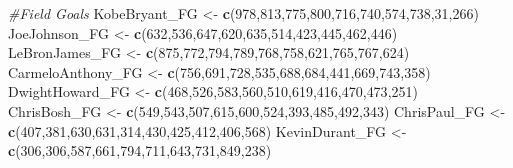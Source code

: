 \documentclass[
]{article}
\newenvironment{Shaded}{\begin{snugshade}}{\end{snugshade}}
\newcommand{\CommentTok}[1]{\textcolor[rgb]{0.56,0.35,0.01}{\textit{#1}}}
\newcommand{\DecValTok}[1]{\textcolor[rgb]{0.00,0.00,0.81}{#1}}
\newcommand{\KeywordTok}[1]{\textcolor[rgb]{0.13,0.29,0.53}{\textbf{#1}}}
\newcommand{\NormalTok}[1]{#1}
\newcommand{\StringTok}[1]{\textcolor[rgb]{0.31,0.60,0.02}{#1}}
\begin{document}
\begin{Shaded}
\begin{Highlighting}[]
\CommentTok{#Field Goals}
\NormalTok{KobeBryant_FG <-}\StringTok{ }\KeywordTok{c}\NormalTok{(}\DecValTok{978}\NormalTok{,}\DecValTok{813}\NormalTok{,}\DecValTok{775}\NormalTok{,}\DecValTok{800}\NormalTok{,}\DecValTok{716}\NormalTok{,}\DecValTok{740}\NormalTok{,}\DecValTok{574}\NormalTok{,}\DecValTok{738}\NormalTok{,}\DecValTok{31}\NormalTok{,}\DecValTok{266}\NormalTok{)}
\NormalTok{JoeJohnson_FG <-}\StringTok{ }\KeywordTok{c}\NormalTok{(}\DecValTok{632}\NormalTok{,}\DecValTok{536}\NormalTok{,}\DecValTok{647}\NormalTok{,}\DecValTok{620}\NormalTok{,}\DecValTok{635}\NormalTok{,}\DecValTok{514}\NormalTok{,}\DecValTok{423}\NormalTok{,}\DecValTok{445}\NormalTok{,}\DecValTok{462}\NormalTok{,}\DecValTok{446}\NormalTok{)}
\NormalTok{LeBronJames_FG <-}\StringTok{ }\KeywordTok{c}\NormalTok{(}\DecValTok{875}\NormalTok{,}\DecValTok{772}\NormalTok{,}\DecValTok{794}\NormalTok{,}\DecValTok{789}\NormalTok{,}\DecValTok{768}\NormalTok{,}\DecValTok{758}\NormalTok{,}\DecValTok{621}\NormalTok{,}\DecValTok{765}\NormalTok{,}\DecValTok{767}\NormalTok{,}\DecValTok{624}\NormalTok{)}
\NormalTok{CarmeloAnthony_FG <-}\StringTok{ }\KeywordTok{c}\NormalTok{(}\DecValTok{756}\NormalTok{,}\DecValTok{691}\NormalTok{,}\DecValTok{728}\NormalTok{,}\DecValTok{535}\NormalTok{,}\DecValTok{688}\NormalTok{,}\DecValTok{684}\NormalTok{,}\DecValTok{441}\NormalTok{,}\DecValTok{669}\NormalTok{,}\DecValTok{743}\NormalTok{,}\DecValTok{358}\NormalTok{)}
\NormalTok{DwightHoward_FG <-}\StringTok{ }\KeywordTok{c}\NormalTok{(}\DecValTok{468}\NormalTok{,}\DecValTok{526}\NormalTok{,}\DecValTok{583}\NormalTok{,}\DecValTok{560}\NormalTok{,}\DecValTok{510}\NormalTok{,}\DecValTok{619}\NormalTok{,}\DecValTok{416}\NormalTok{,}\DecValTok{470}\NormalTok{,}\DecValTok{473}\NormalTok{,}\DecValTok{251}\NormalTok{)}
\NormalTok{ChrisBosh_FG <-}\StringTok{ }\KeywordTok{c}\NormalTok{(}\DecValTok{549}\NormalTok{,}\DecValTok{543}\NormalTok{,}\DecValTok{507}\NormalTok{,}\DecValTok{615}\NormalTok{,}\DecValTok{600}\NormalTok{,}\DecValTok{524}\NormalTok{,}\DecValTok{393}\NormalTok{,}\DecValTok{485}\NormalTok{,}\DecValTok{492}\NormalTok{,}\DecValTok{343}\NormalTok{)}
\NormalTok{ChrisPaul_FG <-}\StringTok{ }\KeywordTok{c}\NormalTok{(}\DecValTok{407}\NormalTok{,}\DecValTok{381}\NormalTok{,}\DecValTok{630}\NormalTok{,}\DecValTok{631}\NormalTok{,}\DecValTok{314}\NormalTok{,}\DecValTok{430}\NormalTok{,}\DecValTok{425}\NormalTok{,}\DecValTok{412}\NormalTok{,}\DecValTok{406}\NormalTok{,}\DecValTok{568}\NormalTok{)}
\NormalTok{KevinDurant_FG <-}\StringTok{ }\KeywordTok{c}\NormalTok{(}\DecValTok{306}\NormalTok{,}\DecValTok{306}\NormalTok{,}\DecValTok{587}\NormalTok{,}\DecValTok{661}\NormalTok{,}\DecValTok{794}\NormalTok{,}\DecValTok{711}\NormalTok{,}\DecValTok{643}\NormalTok{,}\DecValTok{731}\NormalTok{,}\DecValTok{849}\NormalTok{,}\DecValTok{238}\NormalTok{)}

\end{Highlighting}
\end{Shaded}
\end{document}
